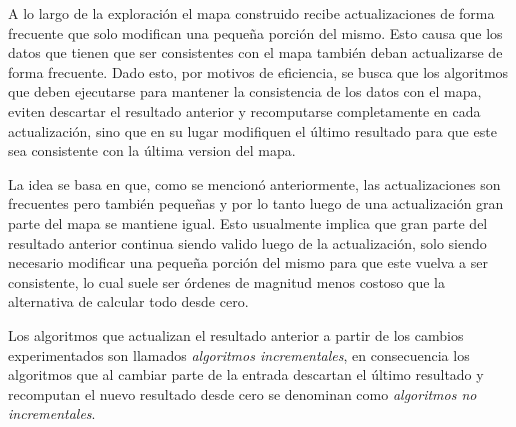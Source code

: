 

A lo largo de la exploración el mapa construido recibe actualizaciones de forma frecuente que solo modifican una pequeña porción del mismo. Esto causa que los datos que tienen que ser consistentes con el mapa también deban actualizarse de forma frecuente. Dado esto, por motivos de eficiencia, se busca que los algoritmos que deben ejecutarse para mantener la consistencia de los datos con el mapa, eviten descartar el resultado anterior y recomputarse completamente en cada actualización, sino que en su lugar modifiquen el último resultado para que este sea consistente con la última version del mapa. 

La idea se basa en que, como se mencionó anteriormente, las actualizaciones son frecuentes pero también pequeñas y por lo tanto luego de una actualización gran parte del mapa se mantiene igual. Esto usualmente implica que gran parte del resultado anterior continua siendo valido luego de la actualización, solo siendo necesario modificar una pequeña porción del mismo para que este vuelva a ser consistente, lo cual suele ser órdenes de magnitud menos costoso que la alternativa de calcular todo desde cero. 

Los algoritmos que actualizan el resultado anterior a partir de los cambios experimentados son llamados \emph{algoritmos incrementales}, en consecuencia los algoritmos que al cambiar parte de la entrada descartan el último resultado y recomputan el nuevo resultado desde cero se denominan como \emph{algoritmos no incrementales}.

